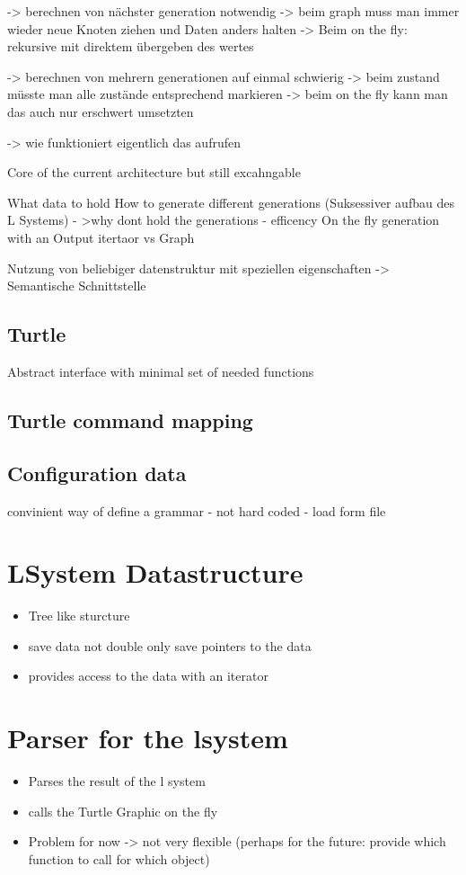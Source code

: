 \documentclass[english]{cpp-hmwk}
\begin{document}
-> berechnen von nächster generation notwendig 	-> beim graph muss man immer wieder neue Knoten ziehen und Daten anders halten
								-> Beim on the fly: rekursive mit direktem übergeben des wertes

-> berechnen von mehrern generationen auf einmal schwierig 
	-> beim zustand müsste man alle zustände entsprechend markieren
	-> beim on the fly kann man das auch nur erschwert umsetzten


-> wie funktioniert eigentlich das aufrufen 


\bigskip

Core of the current architecture but still excahngable

What data to hold 
How to generate different generations (Suksessiver aufbau des L Systems)
 - >why dont hold the generations - efficency
On the fly generation with an Output itertaor vs Graph

 Nutzung von beliebiger datenstruktur mit speziellen eigenschaften -> Semantische Schnittstelle

\subsection{Turtle}
Abstract interface with minimal set of needed functions

\subsection{Turtle command mapping}

\subsection{Configuration data}
convinient way of define a grammar - not hard coded - load form file


\section{LSystem Datastructure}

\begin{itemize}
	\item Tree like sturcture
	\item save data not double only save pointers to the data
	\item provides access to the data with an iterator
\end{itemize}

\section{Parser for the lsystem}
\begin{itemize}
	\item Parses the result of the l system
	\item calls the Turtle Graphic on the fly
	
	\item Problem for now -> not very flexible (perhaps for the future: provide which function to call for which object)
\end{itemize}
\end{document}
